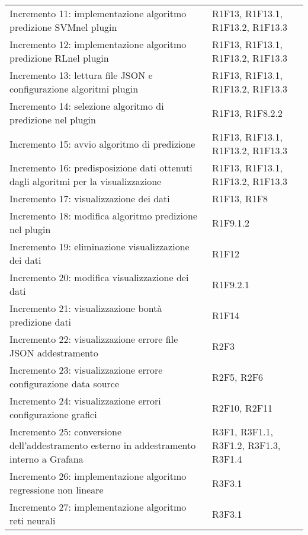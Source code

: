 \begin{longtable} {
		>{\raggedright\arraybackslash}p{85mm}
		>{\raggedleft\arraybackslash}p{40mm}
	}
	Incremento 11: implementazione algoritmo predizione SVM\glosp nel plugin &
	R1F13, R1F13.1, R1F13.2, R1F13.3 \TBstrut \\ [2mm]
	
	Incremento 12: implementazione algoritmo predizione RL\glosp nel plugin &
	R1F13, R1F13.1, R1F13.2, R1F13.3 \TBstrut \\ [2mm]
	
	Incremento 13: lettura file JSON e configurazione algoritmi plugin &
	R1F13, R1F13.1, R1F13.2, R1F13.3 \TBstrut \\ [2mm]
	
	Incremento 14: selezione algoritmo di predizione nel plugin &
	R1F13, R1F8.2.2 \TBstrut \\ [2mm]
	
	Incremento 15: avvio algoritmo di predizione &
	R1F13, R1F13.1, R1F13.2, R1F13.3 \TBstrut \\ [2mm]
	
	Incremento 16: predisposizione dati ottenuti dagli algoritmi per la visualizzazione &
	R1F13, R1F13.1, R1F13.2, R1F13.3 \TBstrut \\ [2mm]
	
	Incremento 17: visualizzazione dei dati &
	R1F13, R1F8 \TBstrut \\ [2mm]
	
	Incremento 18: modifica algoritmo predizione nel plugin &
	R1F9.1.2 \TBstrut \\ [2mm]
	
	Incremento 19: eliminazione visualizzazione dei dati &
	R1F12 \TBstrut \\ [2mm]
	
	Incremento 20: modifica visualizzazione dei dati &
	R1F9.2.1 \TBstrut \\ [2mm]
	
	Incremento 21: visualizzazione bontà predizione dati &
	R1F14 \TBstrut \\ [2mm]
	
	Incremento 22: visualizzazione errore file JSON addestramento &
	R2F3 \TBstrut \\ [2mm]
	
	Incremento 23: visualizzazione errore configurazione data source &
	R2F5, R2F6 \TBstrut \\ [2mm]
	
	Incremento 24: visualizzazione errori configurazione grafici &
	R2F10, R2F11 \TBstrut \\ [2mm]
	
	Incremento 25: conversione dell'addestramento esterno in addestramento interno a Grafana\glosp &
	R3F1, R3F1.1, R3F1.2, R3F1.3, R3F1.4 \TBstrut \\ [2mm]
	
	Incremento 26: implementazione algoritmo regressione non lineare &
	R3F3.1 \TBstrut \\ [2mm]
	
	Incremento 27: implementazione algoritmo reti neurali &
	R3F3.1 \TBstrut \\ [2mm]
	
\end{longtable}
 
